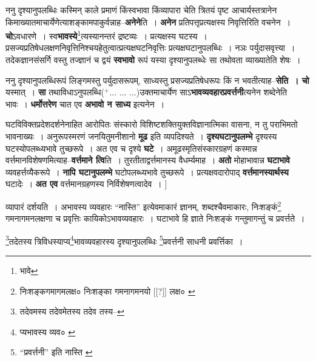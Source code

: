 \documentclass[article,12pt,a4paper]{memoir}
\newcommand{\add}[1]{($^{+}$#1)}
\begin{document}
	  \pstart ननु दृश्यानुपलब्धिः कस्मिन् काले प्रमाणं किंस्वभावा किंव्यापारा चेति त्रितयं पृष्ट आचार्यस्तत्रानेन किमाख्यातमाचार्येणेत्याशङ्कामपाकुर्वन्नाह--\textbf{अनेने}ति । \textbf{अनेन} प्रतिपत्तृप्रत्यक्षस्य निवृत्तिरिति वचनेन । \textbf{चो}ऽवधारणे । स्व\textbf{भावस्ये}\footnote{भावे}\-त्यस्यानन्तरं द्रष्टव्यः । प्रत्यक्षस्य घटस्य । प्रसज्यप्रतिषेधलक्षणनिवृत्तिनिश्चयहेतुत्वात्प्रत्यक्षघटनिवृत्तिः प्रत्यक्षघटानुपलब्धिः । नञः पर्युदासवृत्त्या । तदेकज्ञानसंसर्गि वस्तु तज्ज्ञानं च द्वयं \textbf{स्वभावो} रूपं यस्या दृश्यानुपलब्धेः सा तथोवता व्याख्यातेति शेषः ।
	\pend
      

	  \pstart ननु दृश्यानुपलब्धिरूपं लिङ्गमस्तु पर्युदासरूपम्, साध्यस्तु प्रसज्यप्रतिषेधरूपः किं न भवतीत्याह--\textbf{सेति । चो} यस्मात् । \textbf{सा} तथाविधाऽनुपलब्धि\add{... ... ...}उक्तमाचार्येण साऽ\textbf{भावव्यवहारप्रवर्त्तनी}त्यनेन शब्देनेति भावः । \textbf{धर्मोत्तरेण} चात एव \textbf{अभावो न साध्य} इत्यनेन ।
	\pend
      

	  \pstart घटविविक्तप्र\leavevmode{}देशदर्शनेनाहित आरोपितः संस्कारो विशिष्टशक्तियुक्तविज्ञानात्मिका वासना, न तु पराभिमतो भावनाख्यः । अनुरूपस्मरणं जनयितुमनीशानो \textbf{मूढ} इति व्यपदिश्यते । \textbf{दृश्यघटानुपलम्भे} दृश्यस्य घटस्योपलब्ध्यभावे तुच्छरूपे । अत एव च दृश्ये \textbf{घटे} । अमूढस्मृतिसंस्कारग्रहणं कस्मान्न वर्त्तमानविशेषणमित्याह--\textbf{वर्त्तमाने त्वि}ति । तुरतीताद्वर्त्तमानस्य वैधर्म्यमाह । \textbf{अतो} मोहाभावान्न \textbf{घटाभावे} व्यवहर्त्तव्यैकरूपे । \textbf{नापि घटानुपलम्भे} घटोपलब्ध्यभावे तुच्छरूपे । प्रत्यक्षवदारोपाद् \textbf{वर्त्तमानस्यार्थस्य} घटादेः । \textbf{अत एव} वर्त्तमानग्रहणस्य निर्विशेषणत्वादेव ।
	\pend
      [[अस्पष्टम्--सं०]]
	  \bigskip
	  \begingroup
	

	  \pstart व्यापारं दर्शयति । अभावस्य व्यवहारः “नास्ति” इत्येवमाकारं ज्ञानम्, शब्दश्चैवमाकारः, निःशङ्कं\footnote{निःशङ्कगमागमलक्ष० \cite{dp-msD} \cite{dp-msB} निःशङ्का गमनागमनयो [[?]] लक्ष० \cite{dp-msC}} गमनागमनलक्षणा च प्रवृत्तिः कायिकोऽभावव्यवहारः । घटाभावे हि ज्ञाते निःशङ्कं गन्तुमागन्तुं च प्रवर्त्तते ।
	\pend
       

	  \pstart \footnote{तदेवमस्य \cite{dp-msC} \cite{dp-msD} तदेवमेतस्य \cite{dp-msA} \cite{dp-edP} \cite{dp-edH} \cite{dp-edE} \cite{dp-edN} तदेव तस्य--\cite{dp-msB}}\-तदेतस्य त्रिविधस्याप्य\footnote{प्यभावस्य व्यव० \cite{dp-msC}}\-भावव्यवहारस्य दृश्यानुपलब्धिः \footnote{“प्रवर्त्तनी” इति नास्ति \cite{dp-msA} \cite{dp-msB} \cite{dp-msC} \cite{dp-msD} \cite{dp-edP} \cite{dp-edH} \cite{dp-edE} \cite{dp-edN}}\-प्रवर्त्तनी साधनी प्रवर्त्तिका ।
	\pend
       
\end{document}
